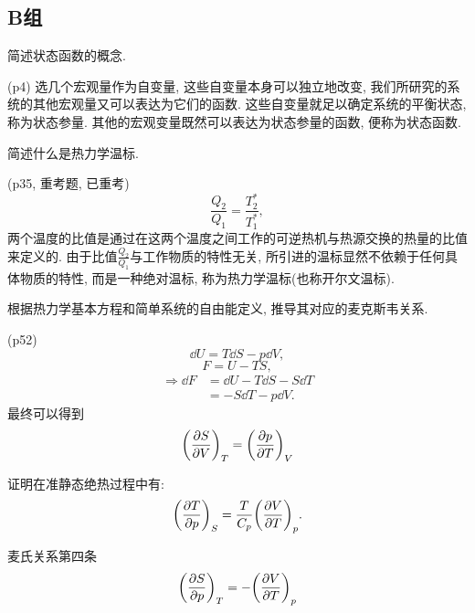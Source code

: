\subsection{B组}
\begin{questions}
  \question 简述状态函数的概念.
  \begin{solution}
    (p4) 选几个宏观量作为自变量, 这些自变量本身可以独立地改变, 我们所研究的系统的其他宏观量又可以表达为它们的函数. 这些自变量就足以确定系统的平衡状态, 称为状态参量. 其他的宏观变量既然可以表达为状态参量的函数, 便称为状态函数.
  \end{solution}
  \question 简述什么是热力学温标.
  \begin{solution}
    (p35, 重考题, 已重考)
    \begin{equation}
      \frac{Q_2}{Q_1} = \frac{T_2^*}{T_1^*},
    \end{equation}
    两个温度的比值是通过在这两个温度之间工作的可逆热机与热源交换的热量的比值来定义的. 由于比值$\frac{Q_2}{Q_1}$与工作物质的特性无关, 所引进的温标显然不依赖于任何具体物质的特性, 而是一种绝对温标, 称为热力学温标(也称开尔文温标).
  \end{solution}
  \question 根据热力学基本方程和简单系统的自由能定义, 推导其对应的麦克斯韦关系.
  \begin{solution}
    (p52)
    \begin{equation}
      \dd U = T\dd S - p\dd V,
    \end{equation}
    \begin{equation}
      F = U - TS,
    \end{equation}
    \begin{equation}
      \begin{aligned}
        \Rightarrow \dd F & = \dd U - T\dd S - S\dd T \\
                          & = -S\dd T - p\dd V.
      \end{aligned}
    \end{equation}
    最终可以得到
    \begin{equation}
      \qty(\pdv{S}{V})_T = \qty(\pdv{p}{T})_V
    \end{equation}
  \end{solution}
  \question 证明在准静态绝热过程中有:
  \begin{equation}
    \qty(\pdv{T}{p})_S = \frac{T}{C_p} \qty(\pdv{V}{T})_p.
  \end{equation}
  \begin{solution}
    麦氏关系第四条
    \begin{equation}
      \qty(\pdv{S}{p})_T = -\qty(\pdv{V}{T})_p

\end{equation}
\end{solution}
\end{questions}
